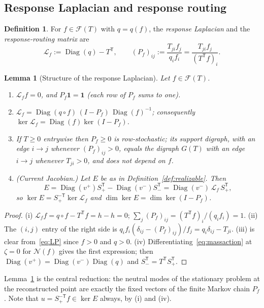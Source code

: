 \documentclass[11pt,reqno]{amsart}
\theoremstyle{plain}
\newtheorem{lemma}[theorem]{Lemma}
\theoremstyle{definition}
\newtheorem{definition}[theorem]{Definition}
\theoremstyle{remark}
\numberwithin{equation}{section}
\newcommand{\one}{\mathbf{1}}
\newcommand{\Diag}{\operatorname{Diag}}
\newcommand{\Ker}{\operatorname{ker}}
\newcommand{\Sp}{S_{+}}
\newcommand{\Sm}{S_{-}}
\newcommand{\T}{\mathsf{T}}
\newcommand{\cone}{\mathcal{F}}
\renewcommand{\odot}{\circ}
\begin{document}
\subsection{Response Laplacian and response routing}
\begin{definition}\label{def:laplacian}
For $f\in\cone(T)$ with $q=q(f)$, the \emph{response Laplacian} and the \emph{response-routing matrix} are
\begin{equation}\label{eq:LP}
\mathcal L_f:=\Diag(q)-T^{\T},\qquad (P_f)_{ij}:=\frac{T_{ji}f_j}{q_if_i}=\frac{T_{ji}f_j}{(T^{\T}f)_i}.
\end{equation}
\end{definition}

\begin{lemma}[Structure of the response Laplacian]\label{lem:laplacian}
Let $f\in\cone(T)$.
\begin{enumerate}[label=(\roman*)]
\item $\mathcal L_ff=0$, and $P_f\one=\one$ (each row of $P_f$ sums to one).
\item $\mathcal L_f=\Diag(q\odot f)\,(I-P_f)\,\Diag(f)^{-1}$; consequently $\Ker\mathcal L_f=\Diag(f)\Ker(I-P_f)$.
\item If $T\ge0$ entrywise then $P_f\ge0$ is row-stochastic; its support digraph, with an edge $i\to j$ whenever $(P_f)_{ij}>0$, equals the digraph $G(T)$ with an edge $i\to j$ whenever $T_{ji}>0$, and does not depend on $f$.
\item (Current Jacobian.)  Let $E$ be as in Definition~\ref{def:realizable}.  Then
\begin{equation}\label{eq:Efactor}
E=\Diag(v^+)\Sp^{\T}-\Diag(v^-)\Sm^{\T}=\Diag(v^-)\,\mathcal L_f\,\Sp^{\T},
\end{equation}
so $\Ker E=\Sp^{-\T}\Ker\mathcal L_f$ and $\dim\Ker E=\dim\Ker(I-P_f)$.
\end{enumerate}
\end{lemma}

\begin{proof}
(i) $\mathcal L_ff=q\odot f-T^{\T}f=h-h=0$; $\sum_j(P_f)_{ij}=(T^{\T}f)_i/(q_if_i)=1$.  (ii) The $(i,j)$ entry of the right side is $q_if_i(\delta_{ij}-(P_f)_{ij})/f_j=q_i\delta_{ij}-T_{ji}$.  (iii) is clear from~\eqref{eq:LP} since $f>0$ and $q>0$.  (iv) Differentiating~\eqref{eq:massaction} at $\zeta=0$ for $\mathcal N(f)$ gives the first expression; then $\Diag(v^+)=\Diag(v^-)\Diag(q)$ and $\Sm^{\T}=T^{\T}\Sp^{\T}$.
\end{proof}

Lemma~\ref{lem:laplacian} is the central reduction: the neutral modes of the stationary problem at the reconstructed point are exactly the fixed vectors of the finite Markov chain $P_f$.  Note that $u=\Sp^{-\T}f\in\Ker E$ always, by (i) and (iv).
\end{document}
